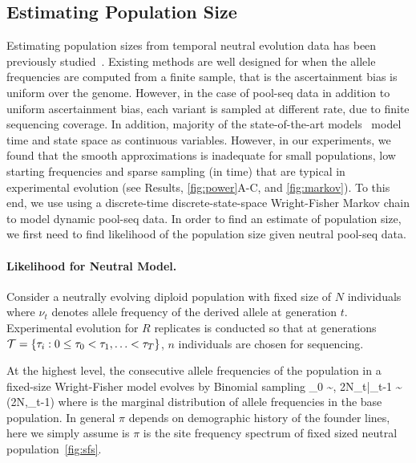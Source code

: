 \subsection{Estimating Population Size}
Estimating population sizes from temporal neutral evolution data has 
been previously studied~\cite{williamson1999using,anderson2000monte, 
bollback2008estimation, Terhorst2015Multi}. Existing methods are well 
designed 
for when 
the allele 
frequencies are computed from a finite sample, that is the 
ascertainment bias 
is uniform over the genome. However, in the case of pool-seq data in 
addition 
to uniform ascertainment bias, 
each variant is sampled at different rate, due to finite sequencing 
coverage. In addition, majority of the state-of-the-art 
models~\cite{bollback2008estimation,feder2014Identifying,topa2015gaussian,Terhorst2015Multi}
model time and state space as continuous variables. However, in our 
experiments, we found that the
smooth approximations is inadequate for small populations, low
starting frequencies and sparse sampling (in time) that are typical in
experimental evolution (see Results, \ref{fig:power}A-C, and 
\ref{fig:markov}). To this end, we use using a discrete-time
discrete-state-space Wright-Fisher Markov chain to model dynamic 
pool-seq data. 
In order to find an estimate of population size, we first need to find 
likelihood of the population size given neutral pool-seq data.


\paragraph{Likelihood for Neutral Model.}
Consider a neutrally evolving diploid population with fixed size of  
$N$ 
individuals where 
$\nu_t$ denotes allele frequency of the derived allele at generation 
$t$.
Experimental evolution for $R$ replicates is conducted so that at 
generations 
 ${\cal T}= \{\tau_i: 0\le \tau_0<\tau_1,\ldots< \tau_T\}$, $n$ individuals 
 are chosen for sequencing. 
 

 At the highest level, the consecutive allele frequencies of the population in 
 a fixed-size Wright-Fisher model evolves by Binomial sampling
 \beq
 \nu_0 \sim \pi, \hspace{1in} 2N\nu_t|\nu_{t-1} \sim \bino(2N,\nu_{t-1})
 \eeq
where is the marginal distribution of allele frequencies in the base 
population. In general $\pi$ depends on demographic history of the founder 
lines, here we simply assume is $\pi$ is the site frequency spectrum of fixed 
sized neutral population~\ref{fig:sfs}.

